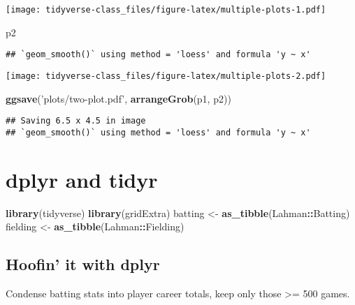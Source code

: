 \documentclass[]{book}
\newenvironment{Shaded}{\begin{snugshade}}{\end{snugshade}}
\newcommand{\KeywordTok}[1]{\textcolor[rgb]{0.13,0.29,0.53}{\textbf{#1}}}
\newcommand{\StringTok}[1]{\textcolor[rgb]{0.31,0.60,0.02}{#1}}
\newcommand{\OperatorTok}[1]{\textcolor[rgb]{0.81,0.36,0.00}{\textbf{#1}}}
\newcommand{\NormalTok}[1]{#1}
\begin{document}
\texttt{[image: tidyverse-class\_files/figure-latex/multiple-plots-1.pdf]}

\begin{Shaded}
\begin{Highlighting}[]
\NormalTok{p2}
\end{Highlighting}
\end{Shaded}

\begin{verbatim}
## `geom_smooth()` using method = 'loess' and formula 'y ~ x'
\end{verbatim}

\texttt{[image: tidyverse-class\_files/figure-latex/multiple-plots-2.pdf]}

\begin{Shaded}
\begin{Highlighting}[]
\KeywordTok{ggsave}\NormalTok{(}\StringTok{'plots/two-plot.pdf'}\NormalTok{, }\KeywordTok{arrangeGrob}\NormalTok{(p1, p2))}
\end{Highlighting}
\end{Shaded}

\begin{verbatim}
## Saving 6.5 x 4.5 in image
## `geom_smooth()` using method = 'loess' and formula 'y ~ x'
\end{verbatim}

\chapter{dplyr and tidyr}\label{ch:dplyr}

\begin{Shaded}
\begin{Highlighting}[]
\KeywordTok{library}\NormalTok{(tidyverse)}
\KeywordTok{library}\NormalTok{(gridExtra)}
\NormalTok{batting <-}\StringTok{ }\KeywordTok{as_tibble}\NormalTok{(Lahman}\OperatorTok{::}\NormalTok{Batting)}
\NormalTok{fielding <-}\StringTok{ }\KeywordTok{as_tibble}\NormalTok{(Lahman}\OperatorTok{::}\NormalTok{Fielding)}
\end{Highlighting}
\end{Shaded}

\section{Hoofin' it with dplyr}\label{hoofin-it-with-dplyr}

Condense batting stats into player career totals, keep only those
\textgreater{}= 500 games.
\end{document}
